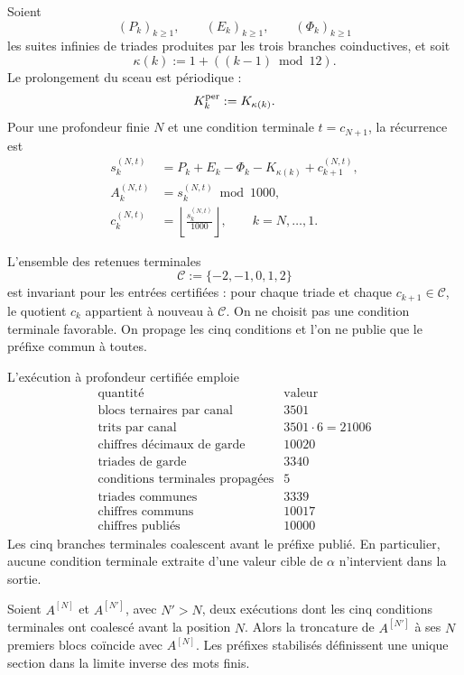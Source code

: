 Soient
\[
 (P_k)_{k\geq1},
 \qquad
 (E_k)_{k\geq1},
 \qquad
 (\Phi_k)_{k\geq1}
\]
les suites infinies de triades produites par les trois branches
coinductives, et soit
\[
 \kappa(k):=1+((k-1)\bmod12).
\]
Le prolongement du sceau est périodique :
\[
 K_k^{\rm per}:=K_{\kappa(k)}.
\]
Pour une profondeur finie \(N\) et une condition terminale
\(t=c_{N+1}\), la récurrence est
\begin{equation}
\begin{aligned}
 s_k^{(N,t)}
 &=P_k+E_k-\Phi_k-K_{\kappa(k)}+c_{k+1}^{(N,t)},\\
 A_k^{(N,t)}
 &=s_k^{(N,t)}\bmod1000,\\
 c_k^{(N,t)}
 &=\left\lfloor\frac{s_k^{(N,t)}}{1000}\right\rfloor,
 \qquad k=N,\ldots,1.
\end{aligned}
\label{p12-83-c10-s2:eq:recurrencia-larga-alpha}
\end{equation}

L’ensemble des retenues terminales
\[
 \mathcal C:=\{-2,-1,0,1,2\}
\]
est invariant pour les entrées certifiées : pour chaque triade et chaque
\(c_{k+1}\in\mathcal C\), le quotient \(c_k\) appartient à nouveau à
\(\mathcal C\). On ne choisit pas une condition terminale favorable. On propage
les cinq conditions et l’on ne publie que le préfixe commun à toutes.

L’exécution à profondeur certifiée emploie
\[
\begin{array}{c|r}
\text{quantité}&\text{valeur}\\ \hline
\text{blocs ternaires par canal}&3501\\
\text{trits par canal}&3501\cdot6=21006\\
\text{chiffres décimaux de garde}&10020\\
\text{triades de garde}&3340\\
\text{conditions terminales propagées}&5\\
\text{triades communes}&3339\\
\text{chiffres communs}&10017\\
\text{chiffres publiés}&10000
\end{array}
\]
Les cinq branches terminales coalescent avant le préfixe publié. En
particulier, aucune condition terminale extraite d’une valeur cible de
\(\alpha\) n’intervient dans la sortie.

\begin{theorem}
\label{p12-83-c10-s2:thm:compatibilidad-prolongacion-alpha}
Soient \(A^{[N]}\) et \(A^{[N']}\), avec \(N'>N\), deux exécutions dont les
cinq conditions terminales ont coalescé avant la position \(N\).
Alors la troncature de \(A^{[N']}\) à ses \(N\) premiers blocs
coïncide avec \(A^{[N]}\). Les préfixes stabilisés définissent une unique
section dans la limite inverse des mots finis.
\end{theorem}

